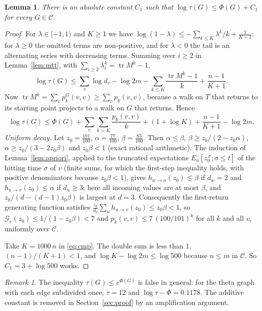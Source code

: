 \documentclass[11pt]{amsart}
\theoremstyle{plain}
\newtheorem{lemma}[theorem]{Lemma}
\theoremstyle{remark}
\newtheorem{remark}[theorem]{Remark}
\newcommand{\cC}{\mathcal{C}}
\newcommand{\cG}{\mathcal{G}}
\DeclareMathOperator{\tr}{tr}
\begin{document}
\begin{lemma}\label{lem:compare}
There is an absolute constant $C_1$ such that $\log\tau(G)\le\Phi(G)+C_1$ for every $G\in\cC$.
\end{lemma}
\begin{proof}
For $\lambda\in[-1,1)$ and $K\ge1$ we have $\log(1-\lambda)\le-\sum_{k\le K}\lambda^k/k+\frac1{K+1}$: for
$\lambda\ge0$ the omitted terms are non-positive, and for $\lambda<0$ the tail is an alternating series with
decreasing terms. Summing over $i\ge2$ in Lemma~\ref{lem:mtt}, with $\sum_{i\ge2}\lambda_i^k=\tr M^k-1$,
\[
 \log\tau(G)\le\sum_v\log d_v-\log 2m-\sum_{k\le K}\frac{\tr M^k-1}{k}+\frac{n-1}{K+1}.
\]
Now $\tr M^k=\sum_vp^G_k(v,v)\ge\sum_vp_k(v,v)$, because a walk on $T$ that returns to its starting point projects
to a walk on $G$ that returns. Hence
\begin{equation}\label{eq:cmp}
 \log\tau(G)\le\Phi(G)+\sum_v\sum_{k>K}\frac{p_k(v,v)}{k}+(1+\log K)+\frac{n-1}{K+1}-\log 2m .
\end{equation}
\emph{Uniform decay.} Let $z_0=\frac{101}{100}$, $\alpha=\frac{77}{100}$, $\beta=\frac{83}{100}$. Then
$\alpha\le\beta$, $\beta\ge z_0/(2-z_0\alpha)$, $\alpha\ge z_0/(3-2z_0\beta)$ and $z_0\beta<1$ (exact rational
arithmetic). The induction of Lemma~\ref{lem:apriori}, applied to the truncated expectations
$E_u[z_0^{\,\sigma};\sigma\le t]$ of the hitting time $\sigma$ of $v$ (finite sums, for which the first-step
inequality holds, with positive denominators because $z_0\beta<1$), gives $h_{w\to u}(z_0)\le\beta$ if $d_w=2$ and
$h_{u\to v}(z_0)\le\alpha$ if $d_u\ge3$; here all incoming values are at most $\beta$, and
$z_0/(d-(d-1)z_0\beta)$ is largest at $d=3$. Consequently the first-return generating function satisfies
$\frac{z_0}{d_v}\sum_uh_{u\to v}(z_0)\le z_0\beta<1$, so $\cG_v(z_0)\le1/(1-z_0\beta)<7$ and
$p_k(v,v)\le7\,(100/101)^k$ for all $k$ and all $v$, uniformly over $\cC$.

Take $K=1000\,n$ in \eqref{eq:cmp}. The double sum is less than $1$, $(n-1)/(K+1)<1$, and
$\log K-\log 2m\le\log 500$ because $n\le m$ in $\cC$. So $C_1=3+\log 500$ works.
\end{proof}

\begin{remark}
The inequality $\tau(G)\le e^{\Phi(G)}$ is false in general: for the theta graph with each edge subdivided once,
$\tau=12$ and $\log\tau-\Phi=0.1178$. The additive constant is removed in Section~\ref{sec:proof} by an
amplification argument.
\end{remark}
\end{document}
